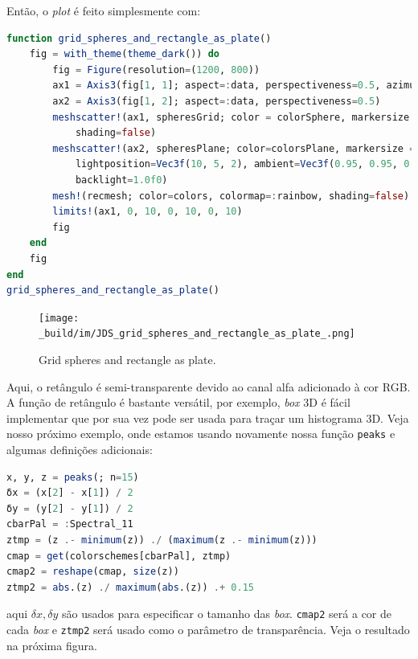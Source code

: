 \documentclass[
  notoc %
]{tufte-book}
\newcommand{\passthrough}[1]{#1}
\begin{document}
Então, o \emph{plot} é feito simplesmente com:

\begin{lstlisting}[language=Julia]
function grid_spheres_and_rectangle_as_plate()
    fig = with_theme(theme_dark()) do
        fig = Figure(resolution=(1200, 800))
        ax1 = Axis3(fig[1, 1]; aspect=:data, perspectiveness=0.5, azimuth=0.72)
        ax2 = Axis3(fig[1, 2]; aspect=:data, perspectiveness=0.5)
        meshscatter!(ax1, spheresGrid; color = colorSphere, markersize = 1,
            shading=false)
        meshscatter!(ax2, spheresPlane; color=colorsPlane, markersize = 0.75,
            lightposition=Vec3f(10, 5, 2), ambient=Vec3f(0.95, 0.95, 0.95),
            backlight=1.0f0)
        mesh!(recmesh; color=colors, colormap=:rainbow, shading=false)
        limits!(ax1, 0, 10, 0, 10, 0, 10)
        fig
    end
    fig
end
grid_spheres_and_rectangle_as_plate()
\end{lstlisting}

\begin{figure}
\hypertarget{fig:grid_spheres_and_rectangle_as_plate}{%
\centering
\texttt{[image: \_build/im/JDS\_grid\_spheres\_and\_rectangle\_as\_plate\_.png]}
\caption{Grid spheres and rectangle as
plate.}\label{fig:grid_spheres_and_rectangle_as_plate}
}
\end{figure}

Aqui, o retângulo é semi-transparente devido ao canal alfa adicionado à
cor RGB. A função de retângulo é bastante versátil, por exemplo,
\emph{box} 3D é fácil implementar que por sua vez pode ser usada para
traçar um histograma 3D. Veja nosso próximo exemplo, onde estamos usando
novamente nossa função \passthrough{\lstinline!peaks!} e algumas
definições adicionais:

\begin{lstlisting}[language=Julia]
x, y, z = peaks(; n=15)
δx = (x[2] - x[1]) / 2
δy = (y[2] - y[1]) / 2
cbarPal = :Spectral_11
ztmp = (z .- minimum(z)) ./ (maximum(z .- minimum(z)))
cmap = get(colorschemes[cbarPal], ztmp)
cmap2 = reshape(cmap, size(z))
ztmp2 = abs.(z) ./ maximum(abs.(z)) .+ 0.15
\end{lstlisting}

aqui \(\delta x, \delta y\) são usados para especificar o tamanho das
\emph{box}. \passthrough{\lstinline!cmap2!} será a cor de cada
\emph{box} e \passthrough{\lstinline!ztmp2!} será usado como o parâmetro
de transparência. Veja o resultado na próxima figura.
\end{document}
